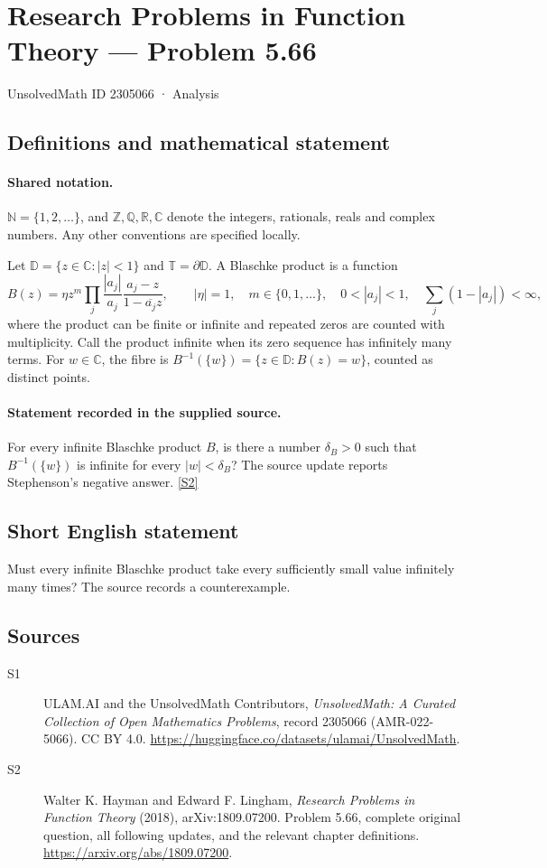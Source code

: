 \documentclass[11pt]{book}
\newcommand{\sref}[2]{\hyperlink{source:#1:#2}{[S#2]}}
\begin{document}
\setcounter{section}{2305065}
\section{Research Problems in Function Theory — Problem 5.66}\label{2305066}
{\small\sffamily UnsolvedMath ID 2305066 · Analysis}
\subsection{Definitions and mathematical statement}

\paragraph{Shared notation.}$\mathbb N=\{1,2,\ldots\}$, and $\mathbb Z,\mathbb Q,\mathbb R,\mathbb C$ denote the integers, rationals, reals and complex numbers. Any other conventions are specified locally.


Let $\mathbb D=\{z\in\mathbb C:|z|<1\}$ and $\mathbb T=\partial\mathbb D$. A Blaschke product is a function \[B(z)=\eta z^m\prod_j\frac{|a_j|}{a_j}\frac{a_j-z}{1-\overline{a_j}z},\qquad |\eta|=1,\quad m\in\{0,1,\ldots\},\quad 0<|a_j|<1,\quad\sum_j(1-|a_j|)<\infty,\] where the product can be finite or infinite and repeated zeros are counted with multiplicity. Call the product infinite when its zero sequence has infinitely many terms. For $w\in\mathbb C$, the fibre is $B^{-1}(\{w\})=\{z\in\mathbb D:B(z)=w\}$, counted as distinct points.
\paragraph{Statement recorded in the supplied source.}
For every infinite Blaschke product $B$, is there a number $\delta_B>0$ such that $B^{-1}(\{w\})$ is infinite for every $|w|<\delta_B$? The source update reports Stephenson’s negative answer. \sref{2305066}{2}
\subsection{Short English statement}
Must every infinite Blaschke product take every sufficiently small value infinitely many times? The source records a counterexample.
\subsection{Sources}
\begin{description}
\item[\hypertarget{source:2305066:1}{S1}] ULAM.AI and the UnsolvedMath Contributors, \emph{UnsolvedMath: A Curated Collection of Open Mathematics Problems}, record 2305066 (AMR-022-5066). CC BY 4.0. \url{https://huggingface.co/datasets/ulamai/UnsolvedMath}.
\item[\hypertarget{source:2305066:2}{S2}] Walter K. Hayman and Edward F. Lingham, \emph{Research Problems in Function Theory} (2018), arXiv:1809.07200. Problem 5.66, complete original question, all following updates, and the relevant chapter definitions. \url{https://arxiv.org/abs/1809.07200}.
\end{description}
\label{end:2305066}
\end{document}
